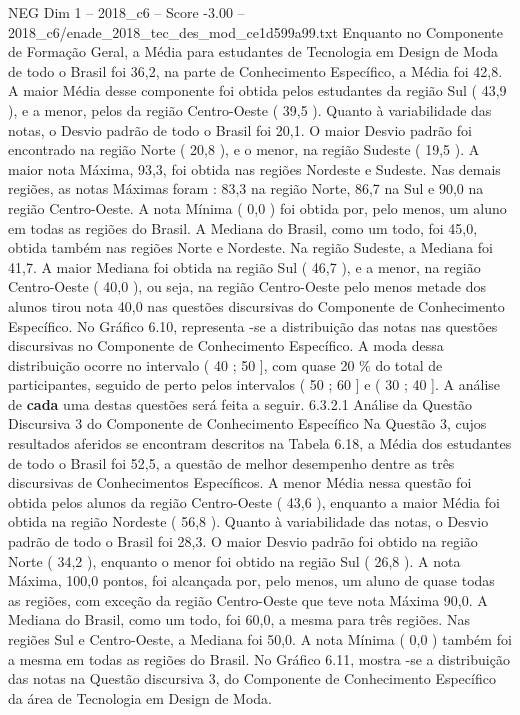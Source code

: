 \begin{textsample}{NEG Dim 1 – 2018\_c6 – Score -3.00 – 2018\_c6/enade\_2018\_tec\_des\_mod\_ce1d599a99.txt}
Enquanto no Componente de Formação Geral, a Média para estudantes de Tecnologia em Design de Moda de todo o Brasil foi 36,2, na parte de Conhecimento Específico, a Média foi 42,8.
A maior Média desse componente foi obtida pelos estudantes da região Sul ( 43,9 ), e a menor, pelos da região Centro-Oeste ( 39,5 ).
Quanto à variabilidade das notas, o Desvio padrão de todo o Brasil foi 20,1.
O maior Desvio padrão foi encontrado na região Norte ( 20,8 ), e o menor, na região Sudeste ( 19,5 ).
A maior nota Máxima, 93,3, foi obtida nas regiões Nordeste e Sudeste.
Nas demais regiões, as notas Máximas foram : 83,3 na região Norte, 86,7 na Sul e 90,0 na região Centro-Oeste.
A nota Mínima ( 0,0 ) foi obtida por, pelo menos, um aluno em todas as regiões do Brasil.
A Mediana do Brasil, como um todo, foi 45,0, obtida também nas regiões Norte e Nordeste.
Na região Sudeste, a Mediana foi 41,7.
A maior Mediana foi obtida na região Sul ( 46,7 ), e a menor, na região Centro-Oeste ( 40,0 ), ou seja, na região Centro-Oeste pelo menos metade dos alunos tirou nota 40,0 nas questões discursivas do Componente de Conhecimento Específico.
No Gráfico 6.10, representa -se a distribuição das notas nas questões discursivas no Componente de Conhecimento Específico.
A moda dessa distribuição ocorre no intervalo ( 40 ; 50 ], com quase 20 \% do total de participantes, seguido de perto pelos intervalos ( 50 ; 60 ] e ( 30 ; 40 ].
A análise de \textbf{cada} uma destas questões será feita a seguir. 6.3.2.1 Análise da Questão Discursiva 3 do Componente de Conhecimento Específico Na Questão 3, cujos resultados aferidos se encontram descritos na Tabela 6.18, a Média dos estudantes de todo o Brasil foi 52,5, a questão de melhor desempenho dentre as três discursivas de Conhecimentos Específicos.
A menor Média nessa questão foi obtida pelos alunos da região Centro-Oeste ( 43,6 ), enquanto a maior Média foi obtida na região Nordeste ( 56,8 ).
Quanto à variabilidade das notas, o Desvio padrão de todo o Brasil foi 28,3.
O maior Desvio padrão foi obtido na região Norte ( 34,2 ), enquanto o menor foi obtido na região Sul ( 26,8 ).
A nota Máxima, 100,0 pontos, foi alcançada por, pelo menos, um aluno de quase todas as regiões, com exceção da região Centro-Oeste que teve nota Máxima 90,0.
A Mediana do Brasil, como um todo, foi 60,0, a mesma para três regiões.
Nas regiões Sul e Centro-Oeste, a Mediana foi 50,0.
A nota Mínima ( 0,0 ) também foi a mesma em todas as regiões do Brasil.
No Gráfico 6.11, mostra -se a distribuição das notas na Questão discursiva 3, do Componente de Conhecimento Específico da área de Tecnologia em Design de Moda.

\end{textsample}
